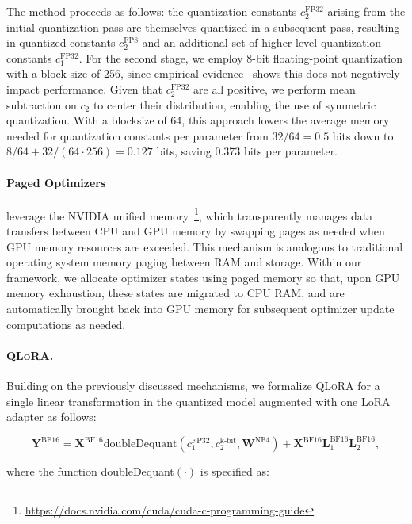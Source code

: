 The method proceeds as follows: the quantization constants $c_2^{\text{FP32}}$ arising from the initial quantization pass are themselves quantized in a subsequent pass, resulting in quantized constants $c_2^{\text{FP8}}$ and an additional set of higher-level quantization constants $c_1^{\text{FP32}}$. For the second stage, we employ 8-bit floating-point quantization with a block size of 256, since empirical evidence~\citep{dettmers2022case} shows this does not negatively impact performance. Given that $c_2^{\text{FP32}}$ are all positive, we perform mean subtraction on $c_2$ to center their distribution, enabling the use of symmetric quantization. With a blocksize of 64, this approach lowers the average memory needed for quantization constants per parameter from $32/64=0.5$ bits down to $8/64 + 32/(64\cdot256) = 0.127$ bits, saving 0.373 bits per parameter.

\paragraph{Paged Optimizers} leverage the NVIDIA unified memory~\footnote{\tiny \url{https://docs.nvidia.com/cuda/cuda-c-programming-guide}}, which transparently manages data transfers between CPU and GPU memory by swapping pages as needed when GPU memory resources are exceeded. This mechanism is analogous to traditional operating system memory paging between RAM and storage. Within our framework, we allocate optimizer states using paged memory so that, upon GPU memory exhaustion, these states are migrated to CPU RAM, and are automatically brought back into GPU memory for subsequent optimizer update computations as needed.

\paragraph{\textsc{QLoRA}.} Building on the previously discussed mechanisms, we formalize \textsc{QLoRA} for a single linear transformation in the quantized model augmented with one LoRA adapter as follows:

\begin{equation}
    \mathbf{Y}^{\text{BF16}} =  \mathbf{X}^{\text{BF16}} \text{doubleDequant}(c_1^{\text{FP32}}, c_2^{\text{k-bit}}, \mathbf{W}^{\text{NF4}}) + \mathbf{X}^{\text{BF16}}\mathbf{L}^{\text{BF16}}_1\mathbf{L}^{\text{BF16}}_2,
\end{equation}

where the function doubleDequant$(\cdot)$ is specified as:

